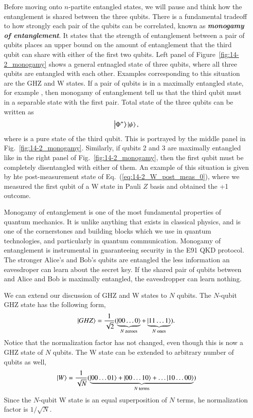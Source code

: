Before moving onto $n$-partite entangled states, we will pause and think how the entanglement is shared between the three qubits.
There is a fundamental tradeoff to how strongly each pair of the qubits can be correlated, known as \textit{\textbf{monogamy of entanglement}}.
It states that the strength of entanglement between a pair of qubits places an upper bound on the amount of entanglement that the third qubit can share with either of the first two qubits.
Left panel of Figure~\ref{fig:14-2_monogamy} shows a general entnagled state of three qubits, where all three qubits are entangled with each other.
Examples corresponding to this situation are the GHZ and W states.
If a pair of qubits is in a maximally entangled state, for example \ket{\Phi+}, then monogamy of entanglement tell us that the third qubit must in a separable state with the first pair.
Total state of the three qubits can be written as
\begin{equation}
    \left| \Phi^+ \right\rangle\left| \psi \right\rangle,
\end{equation}
where \ket{\psi} is a pure state of the third qubit.
This is portrayed by the middle panel in Fig.~\ref{fig:14-2_monogamy}.
Similarly, if qubits 2 and 3 are maximally entangled like in the right panel of Fig.~\ref{fig:14-2_monogamy}, then the first qubit must be completely disentangled with either of them.
An example of this situation is given by hte post-measurement state of Eq.~(\ref{eq:14-2_W_post_meas_0}), where we measured the first qubit of a W state in Pauli $Z$ basis and obtained the +1 outcome.

Monogamy of entanglement is one of the most fundamental properties of quantum mechanics. It is unlike anything that exists in classical physics, and is one of the cornerstones and building blocks which we use in quantum technologies, and particularly in quantum communication.
Monogamy of entanglement is instrumental in guaranteeing security in the E91 QKD protocol.
The stronger Alice's and Bob's qubits are entangled the less information an eavesdroper can learn about the secret key.
If the shared pair of qubits between and Alice and Bob is maximally entangled, the eavesdropper can learn nothing.

We can extend our discussion of GHZ and W states to $N$ qubits.
The $N$-qubit GHZ state has the following form,
\begin{equation}
    \left| GHZ \right\rangle = \frac{1}{\sqrt{2}} ( \underbrace{\left| 00\ldots0 \right\rangle}_{N\text{ zeroes}} + \underbrace{\left| 11\ldots1 \right\rangle}_{N \text{ ones}} ).
\end{equation}
Notice that the normalization factor has not changed, even though this is now a GHZ state of $N$ qubits.
The W state can be extended to arbitrary number of qubits as well,
\begin{equation}
    \left| W \right\rangle = \frac{1}{\sqrt{N}} ( \underbrace{\left| 00\ldots01 \right\rangle + \left| 00\ldots10 \right\rangle + \ldots \left| 10\ldots00 \right\rangle}_{N \text{ terms}} )
\end{equation}
Since the $N$-qubit W state is an equal superposition of $N$ terms, he normalization factor is $1 / \sqrt{N}$.

